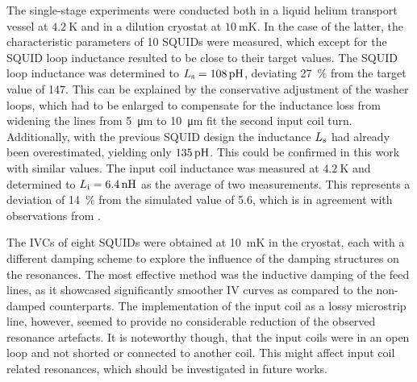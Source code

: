 The single-stage experiments were conducted both in a liquid helium transport vessel at $\qty{4.2}{\kelvin}$ and in a dilution cryostat at $\qty{10}{\milli\kelvin}$. In the case of the latter, the characteristic parameters of 10 SQUIDs were measured, which except for the SQUID loop inductance resulted to be close to their target values. 
The SQUID loop inductance was determined to $L_{\rm s}=\qty{108}{\pH}$, deviating \qty{27}{\percent} from the target value of \qty{147}{\pH}. This can be explained by the conservative adjustment of the washer loops, which had to be enlarged to compensate for the inductance loss from widening the lines from \qty{5}{\micro\meter} to \qty{10}{\micro\meter} fit the second input coil turn. Additionally, with the previous SQUID design the inductance $L_{\rm s}$ had already been overestimated, yielding only $\qty{135}{\pH}$. This could be confirmed in this work with similar values. The input coil inductance was measured at $\qty{4.2}{\kelvin}$ and determined to $L_{\rm i}=\qty{6.4}{\nH}$ as the average of two measurements. This represents a deviation of \qty{14}{\percent} from the simulated value of \qty{5.6}{\nH}, which is in agreement with observations from \cite{Ferring2015, Bauer2022}. 

The IVCs of eight SQUIDs were obtained at \qty{10}{\milli\kelvin} in the cryostat, each with a different damping scheme to explore the influence of the damping structures on the resonances. The most effective method was the inductive damping of the feed lines, as it showcased significantly smoother IV curves as compared to the non-damped counterparts. The implementation of the input coil as a lossy microstrip line, however, seemed to provide no considerable reduction of the observed resonance artefacts. It is noteworthy though, that the input coils were in an open loop and not shorted or connected to another coil. This might affect input coil related resonances, which should be investigated in future works. 

